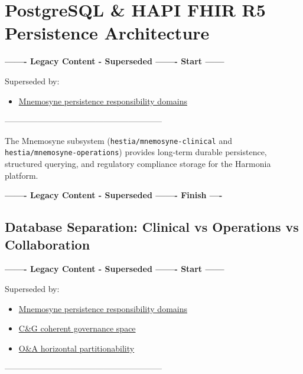 
\chapter{PostgreSQL \& HAPI FHIR R5 Persistence Architecture}
\label{chap:postgresql_persistence}

\par\noindent\textbf{------- Legacy Content - Superseded ------- Start ------}
\par\noindent Superseded by:
\begin{itemize}
  \item \href{../../markdown/05-information-systems-architecture/data-and-persistence.md\#persistence-responsibility-domains}{Mnemosyne persistence responsibility domains}
\end{itemize}
\noindent ---------------------------------------------------------

The Mnemosyne subsystem (\texttt{hestia/mnemosyne-clinical} and \texttt{hestia/mnemosyne-operations}) provides long-term durable persistence, structured querying, and regulatory compliance storage for the Harmonia platform.

\par\noindent\textbf{------- Legacy Content - Superseded ------- Finish ----}


\section{Database Separation: Clinical vs Operations vs Collaboration}

\par\noindent\textbf{------- Legacy Content - Superseded ------- Start ------}
\par\noindent Superseded by:
\begin{itemize}
  \item \href{../../markdown/05-information-systems-architecture/data-and-persistence.md\#persistence-responsibility-domains}{Mnemosyne persistence responsibility domains}
  \item \href{../../markdown/05-information-systems-architecture/data-and-persistence.md\#cg-governance-space}{C\&G coherent governance space}
  \item \href{../../markdown/05-information-systems-architecture/data-and-persistence.md\#oa-partitionability}{O\&A horizontal partitionability}
\end{itemize}
\noindent ---------------------------------------------------------

